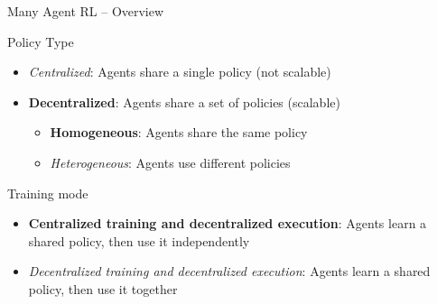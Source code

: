 \documentclass[presentation, 9pt]{beamer}\mode<presentation>{\usetheme{AMSBolognaFC}}
\begin{document}
\begin{frame}[allowframebreaks]{Many Agent RL -- Overview}
\begin{exampleblock}{Policy Type}
\begin{itemize}
	\item \emph{Centralized}: Agents share a single policy (not scalable)
	\item \textbf{Decentralized}: Agents share a set of policies (scalable)
	\begin{itemize}
		\item \textbf{Homogeneous}: Agents share the same policy
		\item \emph{Heterogeneous}: Agents use different policies
	\end{itemize}
\end{itemize}
\end{exampleblock}
\begin{exampleblock}{Training mode}
\begin{itemize}
	\item \textbf{Centralized training and decentralized execution}: Agents learn a shared policy, then use it independently
	\item \emph{Decentralized training and decentralized execution}: Agents learn a shared policy, then use it together
\end{itemize}
\end{exampleblock}
\end{frame}
\end{document}
